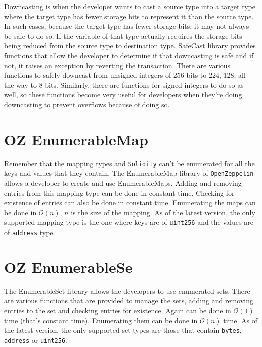 Downcasting is when the developer wants to cast a source type into a target type where the target type has fewer storage bits to represent it than the source type. In such cases, because the target type has fewer storage bits, it may not always be safe to do so. If the variable of that type actually requires the storage bits being reduced from the source type to destination type. SafeCast library provides functions that allow the developer to determine if that downcasting is safe and if not, it raises an exception by reverting the transaction. There are various functions to safely downcast from unsigned integers of 256 bits to 224, 128, all the way to 8 bits. Similarly, there are functions for signed integers to do so as well, so these functions become very useful for developers when they're doing downcasting to prevent overflows because of doing so.

\section{OZ EnumerableMap}
Remember that the mapping types and \verb|Solidity| can't be enumerated for all the keys and values that they contain. The EnumerableMap library of \verb|OpenZeppelin| allows a developer to create and use EnumerableMaps. Adding and removing entries from this mapping type can be done in constant time. Checking for existence of entries can also be done in constant time. Enumerating the maps can be done in $\mathcal{O}(n)$, $n$ is the size of the mapping. As of the latest version, the only supported mapping type is the one where keys are of \verb|uint256| and the values are of \verb|address| type.

\section{OZ EnumerableSe}
The EnumerableSet library allows the developers to use enumerated sets. There are various functions that are provided to manage the sets, adding and removing entries to the set and checking entries for existence. Again can be done in $\mathcal{O}(1)$ time (that's constant time). Enumerating them can be done in $\mathcal{O}(n)$ time. As of the latest version, the only supported set types are those that contain \verb|bytes|, \verb|address| or \verb|uint256|.

